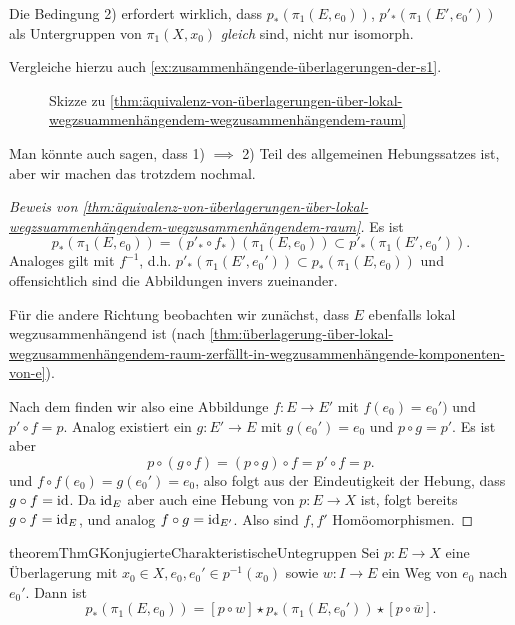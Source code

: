 \begin{warning}
    Die Bedingung 2) erfordert wirklich, dass $p_*(\pi_1(E,e_0))$, $p'_*(\pi_1(E',e_0'))$ als Untergruppen von $\pi_1(X,x_0)$ \textit{gleich} sind, nicht nur isomorph.

    Vergleiche hierzu auch \autoref{ex:zusammenhängende-überlagerungen-der-s1}. 
\end{warning}

\begin{figure}[ht]
    \centering
    \caption{Skizze zu \autoref{thm:äquivalenz-von-überlagerungen-über-lokal-wegzsuammenhängendem-wegzusammenhängendem-raum}}
    \label{fig:skizze-zur-äquivalenz-von-überlagerungen}
\end{figure}

\begin{oral}
    Man könnte auch sagen, dass 1) $\implies$ 2) Teil des allgemeinen Hebungssatzes ist, aber wir machen das trotzdem nochmal.
\end{oral}

\begin{proof}[Beweis von \autoref{thm:äquivalenz-von-überlagerungen-über-lokal-wegzsuammenhängendem-wegzusammenhängendem-raum}]
    Es ist 
    \[
        p_*(\pi_1(E,e_0)) = (p'_* \circ  f_*)(\pi_1(E,e_0)) \subset p'_*(\pi_1(E',e_0'))
    .\] 
    Analoges gilt mit $f^{-1}$, d.h. $p'_*(\pi_1(E',e_0'))\subset p_*(\pi_1(E,e_0))$ und offensichtlich sind die Abbildungen invers zueinander.

    Für die andere Richtung beobachten wir zunächst, dass $E$ ebenfalls lokal wegzusammenhängend ist (nach  \autoref{thm:überlagerung-über-lokal-wegzusammenhängendem-raum-zerfällt-in-wegzusammenhängende-komponenten-von-e}).

    Nach dem  finden wir also eine Abbildunge $f\colon  E \to  E'$ mit $f(e_0) = e_0')$ und $p' \circ  f = p$. Analog existiert ein $g\colon  E ' \to  E$ mit $g(e_0') = e_0$ und $ p \circ  g = p'$. Es ist aber
    \[
        p \circ (g \circ  f) = (p \circ  g) \circ  f = p' \circ  f = p
    .\] 
    und  $f\circ  f(e_0) = g(e_0' ) = e_0$, also folgt aus der Eindeutigkeit der Hebung, dass $g \circ f = \mathrm{id}$. Da $\mathrm{id}_E$ aber auch eine Hebung von  $p\colon  E \to X$ ist, folgt bereits $g \circ  f = \mathrm{id}_E$, und analog $f \circ  g = \mathrm{id}_{E'}$. Also sind $f,f'$ Homöomorphismen.
\end{proof}

\begin{restatable}{theorem}{ThmGKonjugierteCharakteristischeUntegruppen}\label{thm:charakteristische-untergruppen-innerhalb-der-faser-sind-nur-konjugiert-wenn-weg-zwischen-urbildern-existiert}
    Sei $p\colon  E \to  X$ eine Überlagerung mit $x_0\in X, e_0,e_0' \in p^{-1} (x_0)$ sowie $w\colon  I \to  E$ ein Weg von $e_0$ nach $e_0'$. Dann ist
    \[
        p_*(\pi_1(E,e_0)) = [p \circ  w] \star p_*(\pi_1(E,e_0')) \star [p \circ  \overline{w}]
    .\] 
\end{restatable}

